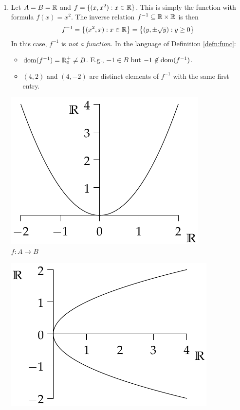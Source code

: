\begin{examples}{}{}
	\begin{enumerate}
		\item\label{ex:reln1} Let $A=B=\mathbb{R}$ and $f=\{(x,x^2):x\in\mathbb{R}\}$. This is simply the function with formula $f(x)=x^2$. The inverse relation $f^{-1}\subseteq\mathbb{R}\times\mathbb{R}$ is then
		\[
			f^{-1}=\bigl\{(x^2,x):x\in\mathbb{R}\bigr\}=\bigl\{(y,\pm\sqrt y):y\ge 0\bigr\}
		\]
		In this case, $f^{-1}$ is \emph{not a function.} In the language of Definition \ref{defn:func}:
		\begin{itemize}
		  \item $\operatorname{dom}(f^{-1})=\mathbb{R}^+_0\neq B$. E.g., $-1\in B$ but $-1\not\in\operatorname{dom}(f^{-1})$.
		  \item $(4,2)$ and $(4,-2)$ are distinct elements of $f^{-1}$ with the same first entry.
		\end{itemize}
		\begin{center}
			\begin{minipage}{0.35\textwidth}\centering
				\includegraphics[width=\textwidth]{relations-20-reln2}\\
				$f:A\to B$
			\end{minipage}\qquad\qquad\qquad
			\begin{minipage}{0.35\textwidth}\centering
				\includegraphics[width=\textwidth]{relations-21-reln2}\\

\end{minipage}
\end{center}
\end{enumerate}
\end{examples}
